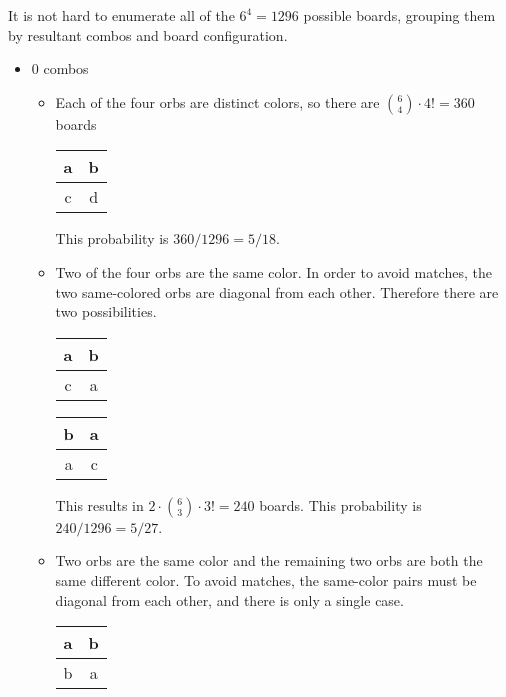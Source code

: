 \documentclass[12pt]{article}
\begin{document}
It is not hard to enumerate all of the $6^4=1296$ possible boards, grouping them by resultant combos and board configuration.
\begin{itemize}
    \item 0 combos
    \begin{itemize}
        \item Each of the four orbs are distinct colors, so there are $\binom{6}{4}\cdot 4!=360$ boards
        \begin{center}
            \begin{tabular}{|c|c|}
            \hline
            a & b \\
            \hline
            c & d \\
            \hline
            \end{tabular}
        \end{center}
        This probability is $360/1296=5/18$.
        \item Two of the four orbs are the same color. In order to avoid matches, the two same-colored orbs are diagonal from each other. Therefore there are two possibilities.
        \begin{center}
            \begin{tabular}{|c|c|}
            \hline
            a & b \\
            \hline
            c & a \\
            \hline
            \end{tabular}
            \qquad
            \begin{tabular}{|c|c|}
            \hline
            b & a \\
            \hline
            a & c \\
            \hline
            \end{tabular}
        \end{center}
        This results in $2\cdot\binom{6}{3}\cdot 3!=240$ boards.
        This probability is $240/1296=5/27$.
        \item Two orbs are the same color and the remaining two orbs are both the same different color. To avoid matches, the same-color pairs must be diagonal from each other, and there is only a single case.
        \begin{center}
            \begin{tabular}{|c|c|}
            \hline
            a & b \\
            \hline
            b & a \\
            \hline

\end{tabular}
\end{center}
\end{itemize}
\end{itemize}
\end{document}
